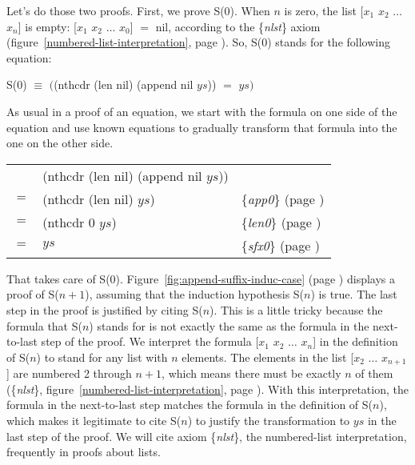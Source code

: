 Let's do those two proofs.
First, we prove S(0).
When $n$ is zero, the list \textsf{[$x_1$ $x_2$ $\dots$ $x_n$]} is empty:
\textsf{[$x_1$ $x_2$ $\dots$ $x_0$]} $=$ \textsf{nil}, according to the \{\emph{nlst}\} axiom
(figure~\ref{numbered-list-interpretation}, page \pageref{numbered-list-interpretation}).
So, S(0) stands for the following equation:
\begin{center}
S(0) $\equiv$ $($\textsf{(nthcdr (len nil) (append nil $ys$))} $=$ $ys)$
\end{center}
As usual in a proof of an equation,
we start with the formula on one side of the equation
and use known equations to gradually transform that formula
into the one on the other side.
\begin{center}
\begin{tabular}{lll}
    & \textsf{(nthcdr (len nil) (append nil $ys$))}  &                                                  \\
$=$ & \textsf{(nthcdr (len nil) $ys$)}               & \{\emph{app0}\} (page \pageref{fig:append-defun})\\
$=$ & \textsf{(nthcdr 0 $ys$)}                       & \{\emph{len0}\} (page \pageref{len-equations})   \\
$=$ & $ys$                                  & \{\emph{sfx0}\} (page \pageref{fig:nthcdr-defun})\\
\end{tabular}
\end{center}

That takes care of S(0). Figure~\ref{fig:append-suffix-induc-case}
(page \pageref{fig:append-suffix-induc-case})
displays a proof of S($n+1$), assuming that
the induction hypothesis S($n$) is true.
The last step in the proof is justified by citing S($n$).
This is a little tricky because the formula that S($n$)
stands for is not exactly the same as the formula in the next-to-last step of the proof.
We interpret the formula \textsf{[$x_1$ $x_2$ $\dots$ $x_n$]} in the definition of S($n$)
to stand for any list with $n$ elements.
The elements in the list \textsf{[$x_2$ $\dots$ $x_{n+1}$] }are numbered 2 through $n+1$,
which means there must be exactly $n$ of them
(\{\emph{nlst}\}, figure~\ref{numbered-list-interpretation}, page \pageref{numbered-list-interpretation}).
With this interpretation, the formula in the next-to-last step
matches the formula in the definition of S($n$),
which makes it legitimate to cite S($n$) to justify
the transformation to $ys$ in the last step of the proof.
We will cite axiom \{\emph{nlst}\}, the numbered-list interpretation,
frequently in proofs about lists.

